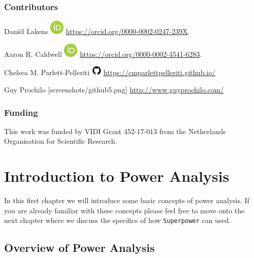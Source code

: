 \documentclass[
]{book}
\begin{document}
\hypertarget{contributors}{%
\subsection*{Contributors}\label{contributors}}

Daniël Lakens \includegraphics{screenshots/orcid.png} \url{https://orcid.org/0000-0002-0247-239X}.

Aaron R. Caldwell \includegraphics{screenshots/orcid.png} \url{https://orcid.org/0000-0002-4541-6283}.

Chelsea M. Parlett-Pelleriti \includegraphics{screenshots/github5.png} \url{https://cmparlettpelleriti.github.io/}

Guy Prochilo {[}screenshots/github5.png{]} \url{http://www.guyprochilo.com/}

\hypertarget{funding}{%
\subsection*{Funding}\label{funding}}

This work was funded by VIDI Grant 452-17-013 from the Netherlands Organisation for Scientific Research.

\hypertarget{introduction-to-power-analysis}{%
\chapter{Introduction to Power Analysis}\label{introduction-to-power-analysis}}

In this first chapter we will introduce some basic concepts of power analysis. If you are already familiar with these concepts please feel free to move onto the next chapter where we discuss the specifics of how \texttt{Superpower} can used.

\hypertarget{overview-of-power-analysis}{%
\section{Overview of Power Analysis}\label{overview-of-power-analysis}}
\end{document}
